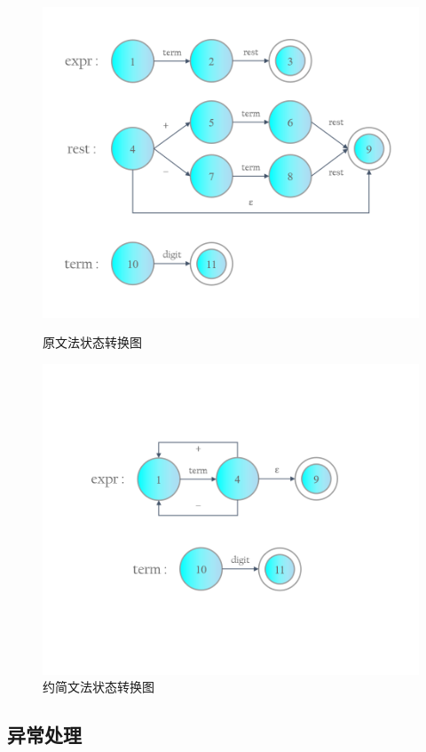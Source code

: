 \documentclass[a4paper, twoside, utf8]{ctexart}
\begin{document}
    \begin{figure}
        \centering
        \begin{minipage}{.45\textwidth}
            \centering
            \includegraphics[width=.9\textwidth]{figure/TD.png}
            \caption{原文法状态转换图}
        \end{minipage}
        \begin{minipage}{.45\textwidth}
            \centering
            \includegraphics[width=.9\textwidth]{figure/RTD.png}
            \caption{约简文法状态转换图}
        \end{minipage}
    \end{figure}

    \subsection{异常处理}
\end{document}
